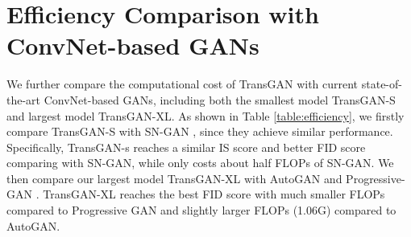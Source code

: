 \documentclass{article}
\begin{document}
\section{Efficiency Comparison with ConvNet-based GANs}
\label{sec:Appendix_F}
We further compare the computational cost of TransGAN with current state-of-the-art ConvNet-based GANs, including both the smallest model TransGAN-S and largest model TransGAN-XL. As shown in Table \ref{table:efficiency}, we firstly compare TransGAN-S with SN-GAN \cite{miyato2018spectral}, since they achieve similar performance. Specifically, TransGAN-s reaches a similar IS score and better FID score comparing with SN-GAN, while only costs about half FLOPs of SN-GAN. We then compare our largest model TransGAN-XL with AutoGAN \cite{gong2019autogan} and Progressive-GAN \cite{karras2017progressive}. TransGAN-XL reaches the best FID score with much smaller FLOPs compared to Progressive GAN and slightly larger FLOPs (1.06G) compared to AutoGAN.
\begin{table}[h]
\caption{Efficiency comparison between TransGAN and ConvNet-based GANs. Results are reported on CIFAR-10 dataset with  resolution.}
\label{table:efficiency}
\centering
\begin{center}
\begin{small}
\begin{sc}
\end{sc}
\end{small}
\end{center}
\vskip -0.1in
\end{table}
\end{document}
